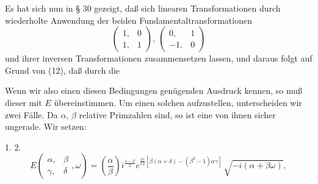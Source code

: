 Es hat sich nun in § 30 gezeigt, daß sich  linearen Transformationen durch wiederholte Anwendung der beiden Fundamentaltransformationen
\[
\begin{pmatrix}1, & 0\\ 1, & 1\end{pmatrix}, \ \begin{pmatrix}0, & 1\\ -1, & 0\end{pmatrix}
\]
und ihrer inversen Transformationen zusammensetzen lassen, und daraus folgt auf Grund von (12), daß durch die 

Wenn wir also einen diesen Bedingungen genügenden Ausdruck kennen, so muß dieser mit $E$ übereinstimmen. Um einen solchen aufzustellen, unterscheiden wir zwei Fälle. Da $\alpha$, $\beta$ relative Primzahlen sind, so ist eine von ihnen sicher ungerade. Wir setzen:

1. 
2. 
\[
E\left(\begin{smallmatrix}\alpha, & \beta\\ \gamma, & \delta\end{smallmatrix}, \omega\right) = \left(\frac{\alpha}{\beta}\right) i^{\frac{1-\beta}{2}} e^{\frac{\pi i}{12}[\beta(\alpha+\delta)-(\beta^2-1)\alpha\gamma]}\,\sqrt{-i(\alpha+\beta\omega)},
\]
